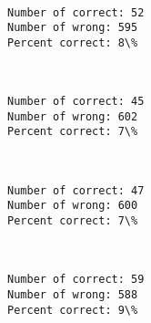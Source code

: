 \documentclass[11pt]{article}
\begin{document}
    \begin{center}
    \end{center}
    { \hspace*{\fill} \\}
    
    \begin{Verbatim}[commandchars=\\\{\}]
Number of correct: 52
Number of wrong: 595
Percent correct: 8\%

    \end{Verbatim}

    \begin{center}
    \end{center}
    { \hspace*{\fill} \\}
    
    \begin{Verbatim}[commandchars=\\\{\}]
Number of correct: 45
Number of wrong: 602
Percent correct: 7\%

    \end{Verbatim}

    \begin{center}
    \end{center}
    { \hspace*{\fill} \\}
    
    \begin{Verbatim}[commandchars=\\\{\}]
Number of correct: 47
Number of wrong: 600
Percent correct: 7\%

    \end{Verbatim}

    \begin{center}
    \end{center}
    { \hspace*{\fill} \\}
    
    \begin{Verbatim}[commandchars=\\\{\}]
Number of correct: 59
Number of wrong: 588
Percent correct: 9\%

    \end{Verbatim}
\end{document}
